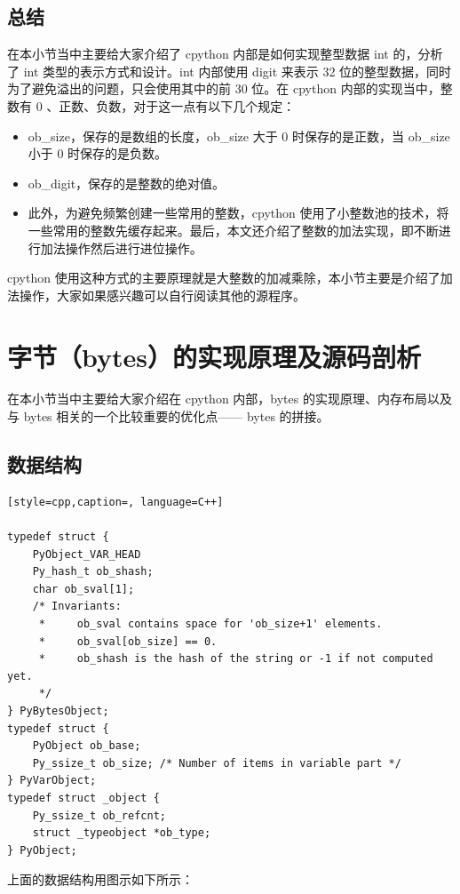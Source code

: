 \subsection{总结}
在本小节当中主要给大家介绍了 cpython 内部是如何实现整型数据 int 的，分析了 int 类型的表示方式和设计。int 内部使用 digit 来表示 32 位的整型数据，同时为了避免溢出的问题，只会使用其中的前 30 位。在 cpython 内部的实现当中，整数有 0 、正数、负数，对于这一点有以下几个规定：
\begin{itemize}
\item ob\_size，保存的是数组的长度，ob\_size 大于 0 时保存的是正数，当 ob\_size 小于 0 时保存的是负数。 
\item ob\_digit，保存的是整数的绝对值。 
\item 此外，为避免频繁创建一些常用的整数，cpython 使用了小整数池的技术，将一些常用的整数先缓存起来。最后，本文还介绍了整数的加法实现，即不断进行加法操作然后进行进位操作。 
\end{itemize}
cpython 使用这种方式的主要原理就是大整数的加减乘除，本小节主要是介绍了加法操作，大家如果感兴趣可以自行阅读其他的源程序。

\section{字节（bytes）的实现原理及源码剖析}
在本小节当中主要给大家介绍在 cpython 内部，bytes 的实现原理、内存布局以及与 bytes 相关的一个比较重要的优化点—— bytes 的拼接。
\subsection{数据结构}
\begin{lstlisting}[style=cpp,caption=, language=C++]

typedef struct {
    PyObject_VAR_HEAD
    Py_hash_t ob_shash;
    char ob_sval[1];
    /* Invariants:
     *     ob_sval contains space for 'ob_size+1' elements.
     *     ob_sval[ob_size] == 0.
     *     ob_shash is the hash of the string or -1 if not computed yet.
     */
} PyBytesObject;
typedef struct {
    PyObject ob_base;
    Py_ssize_t ob_size; /* Number of items in variable part */
} PyVarObject;
typedef struct _object {
    Py_ssize_t ob_refcnt;
    struct _typeobject *ob_type;
} PyObject;
\end{lstlisting}
上面的数据结构用图示如下所示：

